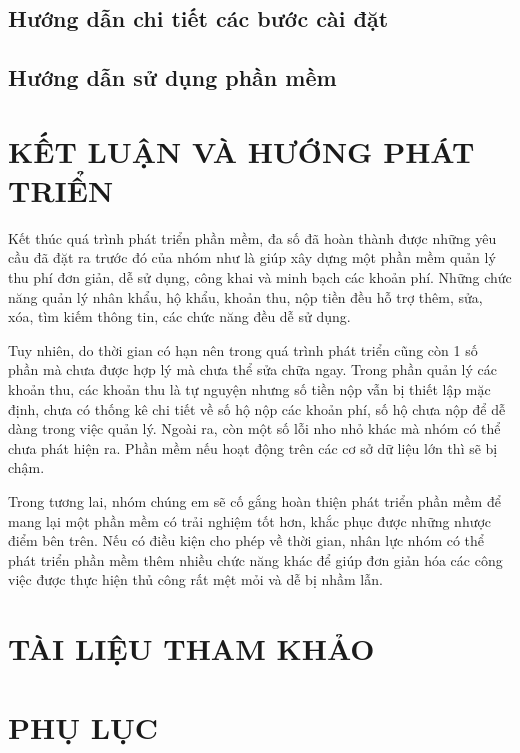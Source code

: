 \documentclass{article}
\begin{document}
\subsection{Hướng dẫn chi tiết các bước cài đặt}
\subsection{Hướng dẫn sử dụng phần mềm}
\newpage

\section*{KẾT LUẬN VÀ HƯỚNG PHÁT TRIỂN}
Kết thúc quá trình phát triển phần mềm, đa số đã hoàn thành được những yêu cầu đã đặt ra trước đó của nhóm như là giúp xây dựng một phần mềm quản lý thu phí đơn giản, dễ sử dụng, công khai và minh bạch các khoản phí. Những chức năng quản lý nhân khẩu, hộ khẩu, khoản thu, nộp tiền đều hỗ trợ thêm, sửa, xóa, tìm kiếm thông tin, các chức năng đều dễ sử dụng.

Tuy nhiên, do thời gian có hạn nên trong quá trình phát triển cũng còn 1 số phần mà chưa được hợp lý mà chưa thể sửa chữa ngay. Trong phần quản lý các khoản thu, các khoản thu là tự nguyện nhưng số tiền nộp vẫn bị thiết lập mặc định, chưa có thống kê chi tiết về số hộ nộp các khoản phí, số hộ chưa nộp để dễ dàng trong việc quản lý. Ngoài ra, còn một số lỗi nho nhỏ khác mà nhóm có thể chưa phát hiện ra.
Phần mềm nếu hoạt động trên các cơ sở dữ liệu lớn thì sẽ bị chậm.

Trong tương lai, nhóm chúng em sẽ cố gắng hoàn thiện phát triển phần mềm để mang lại một phần mềm có trải nghiệm tốt hơn, khắc phục được những nhược điểm bên trên. Nếu có điều kiện cho phép về thời gian, nhân lực nhóm có thể phát triển phần mềm thêm nhiều chức năng khác để giúp đơn giản hóa các công việc được thực hiện thủ công rất mệt mỏi và dễ bị nhầm lẫn.
\newpage

\section*{TÀI LIỆU THAM KHẢO}
\newpage

\section*{PHỤ LỤC}
\end{document}
